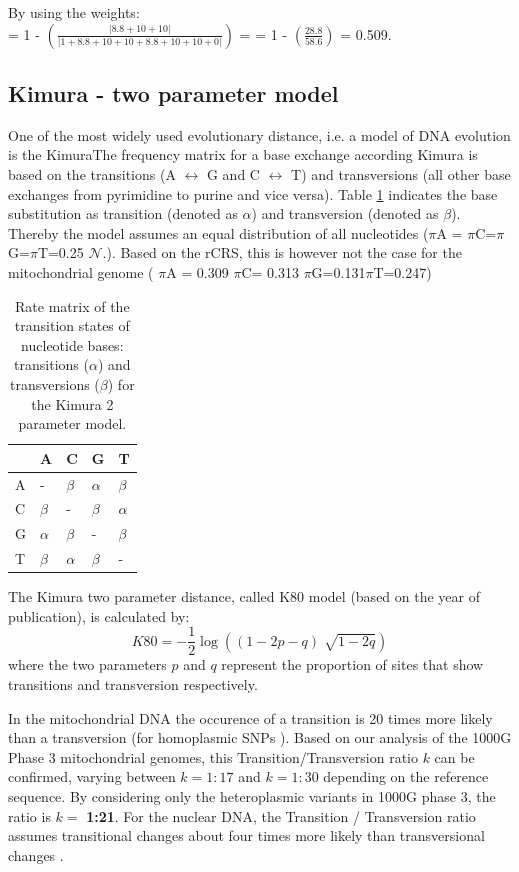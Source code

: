 By using the weights: \\
= 1 - $\left(  \frac{\left| 8.8 + 10 + 10 \right|}{\left| 1 + 8.8 + 10 + 10 + 8.8 + 10 + 10  + 0 \right|}  \right)$  = 
= 1 -  $\left(  \frac{28.8}{58.6} \right)$ = 0.509. 
\subsection{Kimura - two parameter model}
One of the most widely used evolutionary distance, i.e. a model of DNA evolution is the KimuraThe frequency matrix for a base exchange according Kimura\cite{Kimura1980} is based on the transitions (A $\leftrightarrow$ G and C $\leftrightarrow$ T) and transversions (all other base exchanges from pyrimidine to purine and vice versa). Table \ref{hg:kimuratable} indicates the base substitution as transition (denoted as $\alpha$) and transversion (denoted as $\beta$). Thereby the model assumes an equal distribution of all nucleotides ($\pi$A = $\pi$C=$\pi$G=$\pi$T=0.25 $\mathcal{N}.$). Based on the rCRS, this is however not the case for the mitochondrial genome ( $\pi$A = 0.309 $\pi$C= 0.313 $\pi$G=0.131$\pi$T=0.247)
\begin{table}[h]

\centering
\caption{Rate matrix of the transition states of nucleotide bases: transitions ($\alpha$) and transversions ($\beta$) for the Kimura 2 parameter model.}
\label{hg:kimuratable}
\begin{tabular}{lllll}
\hline
   & A&  C   &G  & T\\
\hline

A  & - & $\beta$    & $\alpha$  & $\beta$ \\
C  & $\beta$ &  -   & $\beta$  & $\alpha$ \\
G  & $\alpha$ &  $\beta$    & - & $\beta$ \\
T  & $\beta$ &  $\alpha$    & $\beta$  & - \\
\end{tabular}
\end{table}

The Kimura two parameter distance, called K80 model (based on the year of publication), is calculated by:
\begin{equation}
K80 = - \frac{1}{2} \log((1- 2p -q ) \sqrt[]{1-2q})
\end{equation}
where the two parameters $p$ and $q$ represent the proportion of sites that show transitions and transversion respectively.

In the mitochondrial DNA the occurence of a transition is 20 times more likely than a transversion (for homoplasmic SNPs \cite{Guo2012}). Based on our analysis of the 1000G Phase 3 mitochondrial genomes, this Transition/Transversion ratio $k$ can be confirmed, varying between $k=1:17$ and $k=1:30$ depending on the reference sequence. By considering only the heteroplasmic variants in 1000G phase 3, the ratio is $k=$ \textbf{1:21}. For the nuclear DNA, the Transition / Transversion ratio assumes transitional changes about four times more likely than transversional changes \cite{salemi2009the}. 


